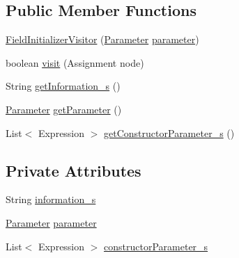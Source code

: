 \subsection*{Public Member Functions}
\begin{DoxyCompactItemize}
\item 
\hyperlink{classit_1_1isislab_1_1masonhelperdocumentation_1_1visitor_1_1_field_initializer_visitor_a6c5fdbf9d44532b6ce8074d8ef3aea6e}{Field\-Initializer\-Visitor} (\hyperlink{classit_1_1isislab_1_1masonhelperdocumentation_1_1analizer_1_1_parameter}{Parameter} \hyperlink{classit_1_1isislab_1_1masonhelperdocumentation_1_1visitor_1_1_field_initializer_visitor_a8abd2a44db33a00a74453b99d98d46c2}{parameter})
\item 
boolean \hyperlink{classit_1_1isislab_1_1masonhelperdocumentation_1_1visitor_1_1_field_initializer_visitor_aa102c9e14ce33b802171e97ff59c6522}{visit} (Assignment node)
\item 
String \hyperlink{classit_1_1isislab_1_1masonhelperdocumentation_1_1visitor_1_1_field_initializer_visitor_a187579f1e01cf9f809726c29e31bbf5a}{get\-Information\-\_\-s} ()
\item 
\hyperlink{classit_1_1isislab_1_1masonhelperdocumentation_1_1analizer_1_1_parameter}{Parameter} \hyperlink{classit_1_1isislab_1_1masonhelperdocumentation_1_1visitor_1_1_field_initializer_visitor_a9d55c4460f40e0ca84c6a027bc26b026}{get\-Parameter} ()
\item 
List$<$ Expression $>$ \hyperlink{classit_1_1isislab_1_1masonhelperdocumentation_1_1visitor_1_1_field_initializer_visitor_a7a18a32e5b29d48dffe1265fb1bc6ca2}{get\-Constructor\-Parameter\-\_\-s} ()
\end{DoxyCompactItemize}
\subsection*{Private Attributes}
\begin{DoxyCompactItemize}
\item 
String \hyperlink{classit_1_1isislab_1_1masonhelperdocumentation_1_1visitor_1_1_field_initializer_visitor_af2beae06e1c3a7541b19ceeb6be6c7b8}{information\-\_\-s}
\item 
\hyperlink{classit_1_1isislab_1_1masonhelperdocumentation_1_1analizer_1_1_parameter}{Parameter} \hyperlink{classit_1_1isislab_1_1masonhelperdocumentation_1_1visitor_1_1_field_initializer_visitor_a8abd2a44db33a00a74453b99d98d46c2}{parameter}
\item 
List$<$ Expression $>$ \hyperlink{classit_1_1isislab_1_1masonhelperdocumentation_1_1visitor_1_1_field_initializer_visitor_ababaa84c922c5ce27fc9880abe7ae4dd}{constructor\-Parameter\-\_\-s}
\end{DoxyCompactItemize}


